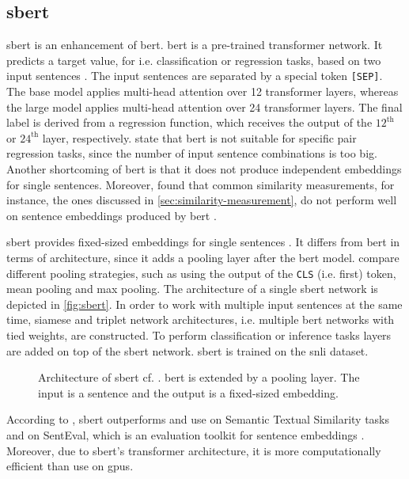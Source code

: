 \subsection{\acl*{sbert}}\label{subsec:hf-sent-ransformers}

\ac{sbert} is an enhancement of \ac{bert}.
\ac{bert} is a pre-trained transformer network.
It predicts a target value, for i.e. classification or regression tasks, based on two input sentences \cite{HfsentTrans2019}.
The input sentences are separated by a special token \texttt{[SEP]}.
The base model applies multi-head attention over 12 transformer layers, whereas the large model applies multi-head attention over 24 transformer layers.
The final label is derived from a regression function, which receives the output of the $12^\text{th}$ or $24^\text{th}$ layer, respectively.
\citeauthor{HfsentTrans2019} state that \ac{bert} is not suitable for specific pair regression tasks, 
since the number of input sentence combinations is too big.
Another shortcoming of \ac{bert} is that it does not produce independent embeddings for single sentences.
Moreover, \citeauthor{HfsentTrans2019} found that common similarity measurements, for instance, the ones discussed in \autoref{sec:similarity-measurement}, 
do not perform well on sentence embeddings produced by \ac{bert} \cite{HfsentTrans2019}.

\ac{sbert} provides fixed-sized embeddings for single sentences \cite{HfsentTrans2019}.
It differs from \ac{bert} in terms of architecture, since it adds a pooling layer after the \ac{bert} model.
\citeauthor{HfsentTrans2019} compare different pooling strategies, such as using the output of the \texttt{CLS} (i.e. first) token, mean pooling and max pooling.
The architecture of a single \ac{sbert} network is depicted in \autoref{fig:sbert}.
In order to work with multiple input sentences at the same time, siamese and triplet network architectures, 
i.e. multiple \ac{bert} networks with tied weights, are constructed.
To perform classification or inference tasks layers are added on top of the \ac{sbert} network.
\ac{sbert} is trained on the \ac{snli} dataset.

\begin{figure}[!htb] %
    \centering
    
    \caption[Architecture of \ac{sbert}]{Architecture of \ac{sbert} cf. \cite{HfsentTrans2019}.
    \ac{bert} is extended by a pooling layer.
    The input is a sentence and the output is a fixed-sized embedding.
    }
    \label{fig:sbert}
\end{figure}

According to \citeauthor{HfsentTrans2019}, \ac{sbert} outperforms \infersent{} and \ac{use} on Semantic Textual Similarity tasks 
and on SentEval, which is an evaluation toolkit for sentence embeddings \cite{HfsentTrans2019}.
Moreover, due to \ac{sbert}'s transformer architecture, it is more computationally efficient than \ac{use} on \acp{gpu}.